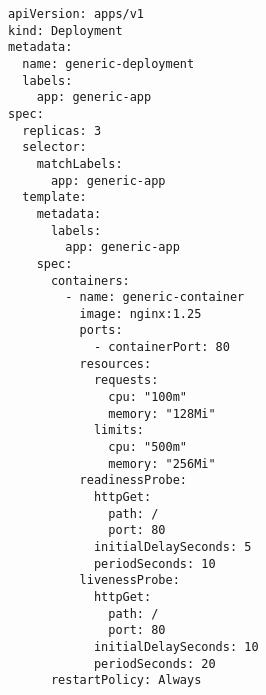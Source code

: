 \begin{verbatim}
apiVersion: apps/v1
kind: Deployment
metadata:
  name: generic-deployment
  labels:
    app: generic-app
spec:
  replicas: 3
  selector:
    matchLabels:
      app: generic-app
  template:
    metadata:
      labels:
        app: generic-app
    spec:
      containers:
        - name: generic-container
          image: nginx:1.25
          ports:
            - containerPort: 80
          resources:
            requests:
              cpu: "100m"
              memory: "128Mi"
            limits:
              cpu: "500m"
              memory: "256Mi"
          readinessProbe:
            httpGet:
              path: /
              port: 80
            initialDelaySeconds: 5
            periodSeconds: 10
          livenessProbe:
            httpGet:
              path: /
              port: 80
            initialDelaySeconds: 10
            periodSeconds: 20
      restartPolicy: Always
\end{verbatim}